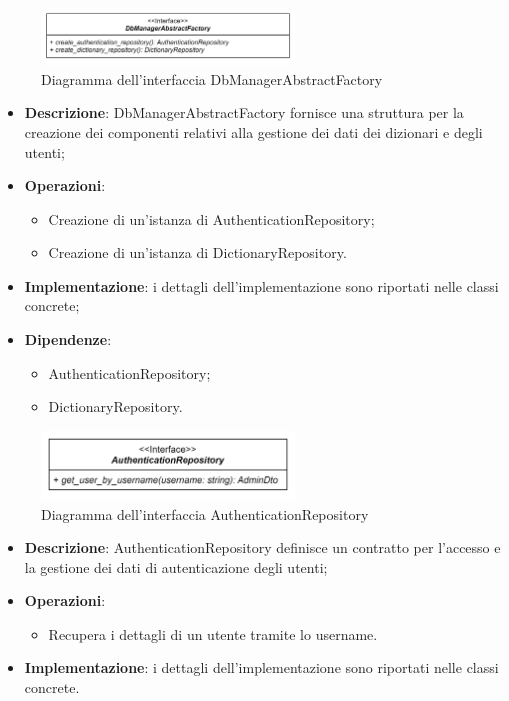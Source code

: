  \label{DbManagerAbstractFactory}
\begin{figure}[H]
    \centering
    \includegraphics[width=0.6\textwidth]{assets/Backend/db_manager_abstract_factory.png}
    \caption{Diagramma dell'interfaccia DbManagerAbstractFactory}
  \end{figure}
\begin{itemize}
    \item \textbf{Descrizione}: DbManagerAbstractFactory fornisce una struttura per la creazione dei componenti relativi alla gestione dei dati dei dizionari e degli utenti;
    \item \textbf{Operazioni}:
    \begin{itemize}
      \item Creazione di un'istanza di AuthenticationRepository;
      \item Creazione di un'istanza di DictionaryRepository.
    \end{itemize}
    \item \textbf{Implementazione}: i dettagli dell'implementazione sono riportati nelle classi concrete;
    \item \textbf{Dipendenze}:
    \begin{itemize}
      \item AuthenticationRepository;
      \item DictionaryRepository.
    \end{itemize}
\end{itemize} 

 \label{AuthenticationRepository}
\begin{figure}[H]
    \centering
    \includegraphics[width=0.6\textwidth]{assets/Backend/authentication_repository.png}
    \caption{Diagramma dell'interfaccia AuthenticationRepository}
  \end{figure}
\begin{itemize}
    \item \textbf{Descrizione}: AuthenticationRepository definisce un contratto per l'accesso e la gestione dei dati di autenticazione degli utenti;
    \item \textbf{Operazioni}: 
    \begin{itemize}
      \item Recupera i dettagli di un utente tramite lo username.
    \end{itemize}
    \item \textbf{Implementazione}: i dettagli dell'implementazione sono riportati nelle classi concrete.
\end{itemize}

